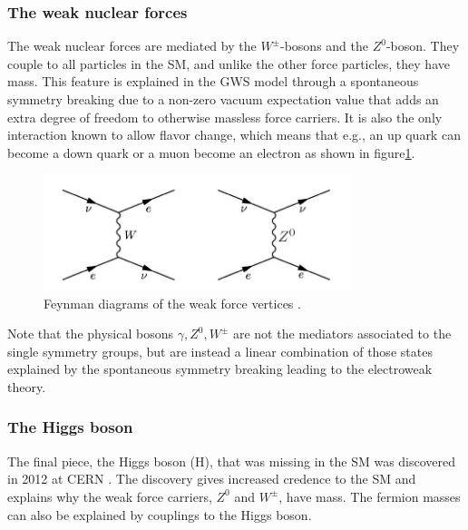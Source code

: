 \subsubsection{The weak nuclear forces}
The weak nuclear forces are mediated by the $W^\pm$-bosons and the $Z^0$-boson. They couple to all particles in the SM, and unlike the other force particles, they have mass. This feature is explained in the GWS model \cite{Xin2007GlashowWeinbergSalamMA} through a spontaneous symmetry breaking due to a non-zero vacuum expectation value that adds an extra degree of freedom to otherwise massless force carriers. It is also the only interaction known to allow flavor change, which means that e.g., an up quark can become a down quark or a muon become an electron as shown in figure\ref{fig:weak_force_FD}. 

\begin{figure}[H]
    \centering
    \includegraphics[width = 0.8\textwidth]{Figures/FeynmanDiagrams/weak.png}
    \caption{Feynman diagrams of the weak force vertices \cite{WEAKforce}.}
    \label{fig:weak_force_FD}
\end{figure}

Note that the physical bosons $\gamma, Z^0, W^\pm$ are not the mediators associated to the single symmetry groups, but are instead a linear combination of those states explained by the spontaneous symmetry breaking leading to the electroweak theory. 

\subsubsection{The Higgs boson}

The final piece, the Higgs boson (H), that was missing in the SM was discovered in 2012 at CERN \cite{Higgs_ATLAS, Higgs_CMS}. The discovery gives increased credence to the SM and explains why the weak force carriers, $Z^0$ and $ W^\pm $, have mass. The fermion masses can also be explained by couplings to the Higgs boson. 

